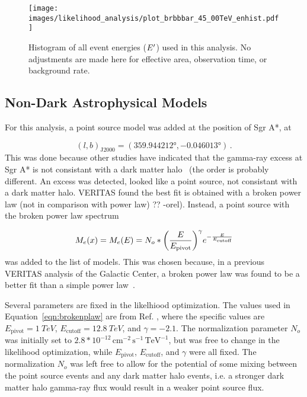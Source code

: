   \begin{figure}[tb]
    \centering
    \texttt{[image: images/likelihood\_analysis/plot\_brbbbar\_45\_00TeV\_enhist.pdf]}
    \caption[Galactic Center Counts Energy Histogram]{
      Histogram of all event energies ($E'$) used in this analysis.
      No adjustments are made here for effective area, observation time, or background rate.
    }
    \label{fig:gc_counts_enhist}
  \end{figure}

  \FloatBarrier

  \subsection{Non-Dark Astrophysical Models}\label{subsec:gcpointsrc}
  For this analysis, a point source model was added at the position of Sgr A*, at
  
  $$(l,b)_{\textrm{J2000}} = (\ang{359.944212}, \ang{-0.046013}) \,. $$
  This was done because other studies have indicated that the gamma-ray excess at Sgr A* is not consistant with a dark matter halo~\cite{gc_pnt_is_not_dm1, gc_pnt_is_not_dm2, gc_pnt_is_not_dm3} {\color{red}(the order is probably different. An excess was detected, looked like a point source, not consistant with a dark matter halo.  VERITAS found the best fit is obtained with a broken power law (not in comparison with power law) ?? -orel)}.
  Instead, a point source with the broken power law spectrum 

  \begin{equation}\label{eqn:brokenplaw}
    M_e(x) = M_e(E) = N_o * { \left ( \frac{E}{E_{\textrm{pivot}}} \right ) }^{\gamma} {e}^{-\frac{E}{E_{\textrm{cutoff}}}}
  \end{equation}
  was added to the list of models.
  This was chosen because, in a previous VERITAS analysis of the Galactic Center, a broken power law was found to be a better fit than a simple power law~\cite{VeritasGCRidge2015}.
  
  Several parameters are fixed in the likelhiood optimization.
  The values used in Equation~\ref{eqn:brokenplaw} are from Ref. \cite{VeritasGCRidge2015}, where the specific values are $E_{\textrm{pivot}}=\SI{1}{TeV}$, $E_{\textrm{cutoff}}=\SI{12.8}{TeV}$, and $\gamma=-2.1$.
  The normalization parameter $N_o$ was initially set to $2.8*{10}^{-12}\,\text{cm}^{-2}\,\text{s}^{-1}\,\text{TeV}^{-1}$, but was free to change in the likelihood optimization, while $E_{\textrm{pivot}}$, $E_{\textrm{cutoff}}$, and $\gamma$ were all fixed.
  The normalization $N_o$ was left free to allow for the potential of some mixing between the point source events and any dark matter halo events, i.e. a stronger dark matter halo gamma-ray flux would result in a weaker point source flux.
  
